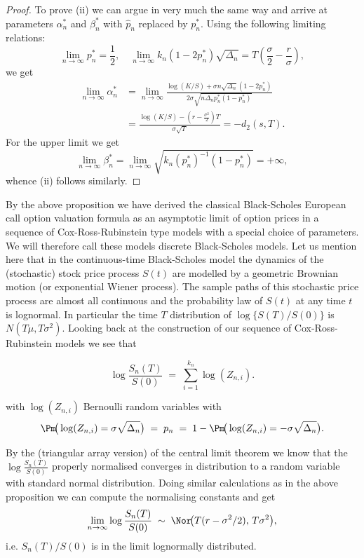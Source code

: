 \begin{proof}
	To prove (ii) we can argue in very much the same way and arrive at parameters \(\alpha_n^*\) and \(\beta_n^*\) with \(\hat{p}_n\) replaced by \(p_n^*\). Using the following limiting relations:
	\[
		\lim_{n\to\infty} p_n^* = \frac{1}{2}, \quad \lim_{n\to\infty} k_n(1 - 2p_n^*)\sqrt{\Delta_n} = T \left(\frac{\sigma}{2} - \frac{r}{\sigma}\right),
	\]
	we get
	\begin{align*}
		\lim_{n\to\infty} \alpha_n^* & = \lim_{n\to\infty} \frac{\log(K/S) + \sigma n \sqrt{\Delta_n}(1 - 2p_n^*)}{2\sigma \sqrt{n\Delta_n p_n^*(1 - p_n^*)}} \\
		                             & = \frac{\log(K/S) - (r - \frac{\sigma^2}{2})T}{\sigma\sqrt{T}} = -d_2(s, T).
	\end{align*}
	For the upper limit we get
	\[
		\lim_{n\to\infty} \beta_n^* = \lim_{n\to\infty} \sqrt{k_n (p_n^*)^{-1}(1 - p_n^*)} = +\infty,
	\]
	whence (ii) follows similarly.
\end{proof}

By the above proposition we have derived the classical Black-Scholes European call option valuation formula as an asymptotic limit of option prices in a sequence of Cox-Ross-Rubinstein type models with a special choice of parameters. We will therefore call these models discrete Black-Scholes models. Let us mention here that in the continuous-time Black-Scholes model the dynamics of the (stochastic) stock price process \(S(t)\) are modelled by a geometric Brownian motion (or exponential Wiener process). The sample paths of this stochastic price process are almost all continuous and the probability law of \(S(t)\) at any time \(t\) is lognormal. In particular the time \(T\) distribution of \(\log\{S(T)/S(0)\}\) is \(N(T\mu, T\sigma^2)\). Looking back at the construction of our sequence of Cox-Ross-Rubinstein models we see that

\begin{equation}
	\log\frac{S_n(T)}{S(0)} \;=\; \sum_{i=1}^{k_n} \log(Z_{n,i}).
\end{equation}

with \(\log(Z_{n,i})\) Bernoulli random variables with
\begin{equation}
	\Pm\!\big(\log(Z_{n,i})=\sigma\sqrt{\Delta_n}\big) \;=\; p_n
	\;=\; 1 - \Pm\!\big(\log(Z_{n,i})=-\sigma\sqrt{\Delta_n}\big).
\end{equation}

By the (triangular array version) of the central limit theorem we know that the
\(\log \frac{S_n(T)}{S(0)}\) properly normalised converges in distribution to a random
variable with standard normal distribution. Doing similar calculations as in the above
proposition we can compute the normalising constants and get
\begin{equation}
	\lim_{n\to\infty} \log\frac{S_n(T)}{S(0)} \;\sim\; \Nor\!\big(T(r-\sigma^2/2),\,T\sigma^2\big),
\end{equation}
i.e. \(S_n(T)/S(0)\) is in the limit lognormally distributed.

